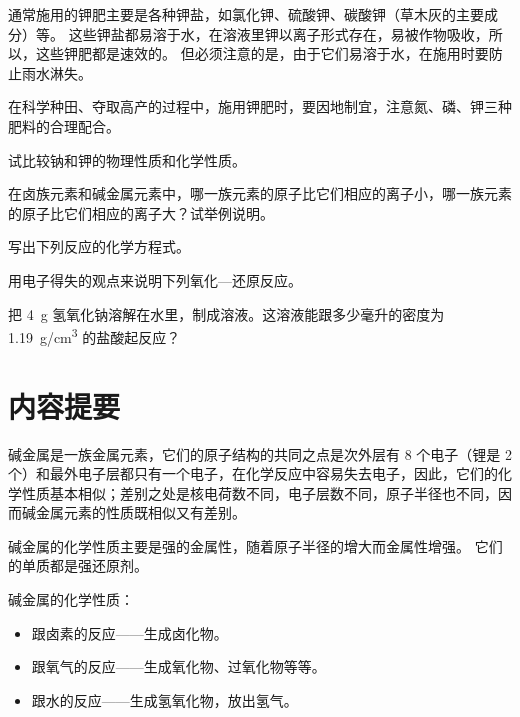 通常施用的钾肥主要是各种钾盐，如氯化钾、硫酸钾、碳酸钾（草木灰的主要成分）等。
这些钾盐都易溶于水，在溶液里钾以离子形式存在，易被作物吸收，所以，这些钾肥都是速效的。
但必须注意的是，由于它们易溶于水，在施用时要防止雨水淋失。

在科学种田、夺取高产的过程中，施用钾肥时，要因地制宜，注意氮、磷、钾三种肥料的合理配合。

\begin{Practice}[习题]
  \begin{question}
    \item 试比较钠和钾的物理性质和化学性质。
    \item 在卤族元素和碱金属元素中，哪一族元素的原子比它们相应的离子小，哪一族元素的原子比它们相应的离子大？试举例说明。
    \item 写出下列反应的化学方程式。
    \begin{tasks}
      \task {}
      \task {}
      \task {}
    \end{tasks}
    \item 用电子得失的观点来说明下列氧化—还原反应。
    \begin{tasks}
      \task {}
      \task {}
    \end{tasks}
    \item 把 \qty{4}{g} 氢氧化钠溶解在水里，制成溶液。这溶液能跟多少毫升的密度为 \qty{1.19}{g/cm^3} 的盐酸起反应？
  \end{question}
\end{Practice}

\section*{内容提要}
\setcounter{subsection}{0}
碱金属是一族金属元素，它们的原子结构的共同之点是次外层有 8 个电子（锂是 2 个）和最外电子层都只有一个电子，在化学反应中容易失去电子，因此，它们的化学性质基本相似；差别之处是核电荷数不同，电子层数不同，原子半径也不同，因而碱金属元素的性质既相似又有差别。

碱金属的化学性质主要是强的金属性，随着原子半径的增大而金属性增强。
它们的单质都是强还原剂。

碱金属的化学性质：
\begin{itemize}
  \item 跟卤素的反应——生成卤化物。
  \item 跟氧气的反应——生成氧化物、过氧化物等等。
  \item 跟水的反应——生成氢氧化物，放出氢气。
\end{itemize}

